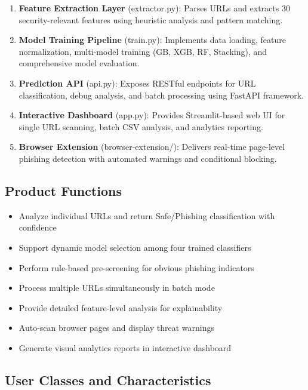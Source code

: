 \documentclass[12pt,a4paper]{report}
\begin{document}
\begin{enumerate}[leftmargin=*]
    \item \textbf{Feature Extraction Layer} (extractor.py): Parses URLs and extracts 
    30 security-relevant features using heuristic analysis and pattern matching.
    
    \item \textbf{Model Training Pipeline} (train.py): Implements data loading, feature 
    normalization, multi-model training (GB, XGB, RF, Stacking), and comprehensive 
    model evaluation.
    
    \item \textbf{Prediction API} (api.py): Exposes RESTful endpoints for URL classification, 
    debug analysis, and batch processing using FastAPI framework.
    
    \item \textbf{Interactive Dashboard} (app.py): Provides Streamlit-based web UI for 
    single URL scanning, batch CSV analysis, and analytics reporting.
    
    \item \textbf{Browser Extension} (browser-extension/): Delivers real-time page-level 
    phishing detection with automated warnings and conditional blocking.
\end{enumerate}

\subsection{Product Functions}
\begin{itemize}[leftmargin=*]
    \item Analyze individual URLs and return Safe/Phishing classification with confidence
    \item Support dynamic model selection among four trained classifiers
    \item Perform rule-based pre-screening for obvious phishing indicators
    \item Process multiple URLs simultaneously in batch mode
    \item Provide detailed feature-level analysis for explainability
    \item Auto-scan browser pages and display threat warnings
    \item Generate visual analytics reports in interactive dashboard
\end{itemize}

\subsection{User Classes and Characteristics}
\end{document}
